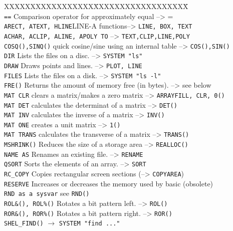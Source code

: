 \begin{tabbing}
XXXXXXXXXXXXXXXXX\=XXXXXXXXXXXXXXXXXX\=\kill\\
\verb|==|\>		Comparison operator for approximately equal  --> =\\
\verb|ARECT, ATEXT, HLINE|\>LINE-A functions--> \verb|LINE, BOX, TEXT|\\
\verb|ACHAR, ACLIP, ALINE, APOLY TO|\> --> \verb|TEXT,CLIP,LINE,POLY|\\
\verb|COSQ(),SINQ()|\>	quick cosine/sine using an internal table --> \verb|COS(),SIN()|\\
\verb|DIR|\>		Lists the files on a disc.  --> \verb|SYSTEM "ls"|\\
\verb|DRAW|\>	      Draws points and lines. --> \verb|PLOT, LINE|\\
\verb|FILES|\>		Lists the files on a disk.  --> \verb|SYSTEM "ls -l"|\\
\verb|FRE()|\>	        Returns the amount of memory free (in bytes). --> see below\\
\verb|MAT CLR|\>        clears a matrix/makes a zero matrix --> \verb|ARRAYFILL, CLR, 0()|\\
\verb|MAT DET|\>        calculates the determinat of a matrix --> \verb|DET()|\\
\verb|MAT INV|\>        calculates the inverse of a matrix --> \verb|INV()|\\
\verb|MAT ONE|\>        creates a unit matrix --> \verb|1()|\\
\verb|MAT TRANS|\>      calculates the transverse of a matrix --> \verb|TRANS()|\\
\verb|MSHRINK()|\>      Reduces the size of a storage area --> \verb|REALLOC()|\\
\verb|NAME AS|\>        Renames an existing file. --> \verb|RENAME|\\
\verb|QSORT|\>  	      Sorts  the elements of an array.  --> \verb|SORT|\\
\verb|RC_COPY|\>   	Copies rectangular screen sections  (--> \verb|COPYAREA|)\\
\verb|RESERVE|\>      	Increases or decreases the memory used by basic (obsolete)\\
\verb|RND as a sysvar|\>  see \verb|RND()|\\
\verb|ROL&(), ROL%()|\>  Rotates a bit pattern left. --> \verb|ROL()|\\
\verb|ROR&(), ROR%()|\>  Rotates a bit pattern right. --> \verb|ROR()|\\
\verb|SHEL_FIND()|\>    $\longrightarrow$ \verb|SYSTEM "find ..."|\\

\end{tabbing}
